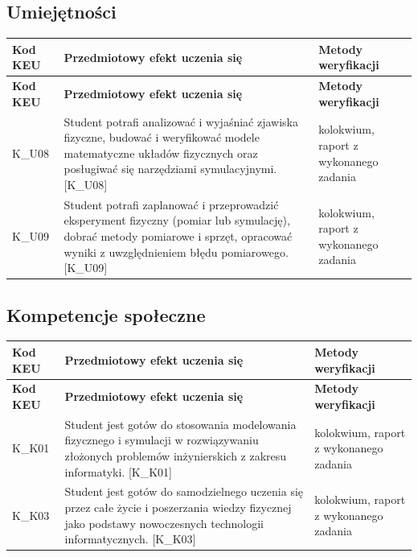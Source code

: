 \documentclass[12pt, a4paper]{article}
\newcommand{\thdrule}{\noalign{\global\setlength{\extrarowheight}{0pt}}}
\newcommand{\thdend}{\noalign{\global\setlength{\extrarowheight}{3pt}}}
\begin{document}
\subsection*{Umiejętności}
{\scriptsize
\begin{longtable}{m{1.6cm}m{9.0cm}m{4.2cm}}
\thdrule\toprule
\rowcolor{pjatkRed} {\color{white}\footnotesize\textbf{\vphantom{Ag}Kod KEU}} & {\color{white}\footnotesize\textbf{\vphantom{Ag}Przedmiotowy efekt uczenia się}} & {\color{white}\footnotesize\textbf{\vphantom{Ag}Metody weryfikacji}} \\
\midrule\thdend
\endfirsthead
\thdrule\toprule
\rowcolor{pjatkRed} {\color{white}\footnotesize\textbf{\vphantom{Ag}Kod KEU}} & {\color{white}\footnotesize\textbf{\vphantom{Ag}Przedmiotowy efekt uczenia się}} & {\color{white}\footnotesize\textbf{\vphantom{Ag}Metody weryfikacji}} \\
\midrule\thdend
\endhead
  \rowcolor{tableRowLight} K\_U08 & Student potrafi analizować i wyjaśniać zjawiska fizyczne, budować i weryfikować modele matematyczne układów fizycznych oraz posługiwać się narzędziami symulacyjnymi. {[}K\_U08{]} & kolokwium, raport z wykonanego zadania \\
  \rowcolor{tableRowAlt} K\_U09 & Student potrafi zaplanować i przeprowadzić eksperyment fizyczny (pomiar lub symulację), dobrać metody pomiarowe i sprzęt, opracować wyniki z uwzględnieniem błędu pomiarowego. {[}K\_U09{]} & kolokwium, raport z wykonanego zadania \\
\bottomrule
\end{longtable}}

\subsection*{Kompetencje społeczne}
{\scriptsize
\begin{longtable}{m{1.6cm}m{9.0cm}m{4.2cm}}
\thdrule\toprule
\rowcolor{pjatkRed} {\color{white}\footnotesize\textbf{\vphantom{Ag}Kod KEU}} & {\color{white}\footnotesize\textbf{\vphantom{Ag}Przedmiotowy efekt uczenia się}} & {\color{white}\footnotesize\textbf{\vphantom{Ag}Metody weryfikacji}} \\
\midrule\thdend
\endfirsthead
\thdrule\toprule
\rowcolor{pjatkRed} {\color{white}\footnotesize\textbf{\vphantom{Ag}Kod KEU}} & {\color{white}\footnotesize\textbf{\vphantom{Ag}Przedmiotowy efekt uczenia się}} & {\color{white}\footnotesize\textbf{\vphantom{Ag}Metody weryfikacji}} \\
\midrule\thdend
\endhead
  \rowcolor{tableRowLight} K\_K01 & Student jest gotów do stosowania modelowania fizycznego i symulacji w rozwiązywaniu złożonych problemów inżynierskich z zakresu informatyki. {[}K\_K01{]} & kolokwium, raport z wykonanego zadania \\
  \rowcolor{tableRowAlt} K\_K03 & Student jest gotów do samodzielnego uczenia się przez całe życie i poszerzania wiedzy fizycznej jako podstawy nowoczesnych technologii informatycznych. {[}K\_K03{]} & kolokwium, raport z wykonanego zadania \\
\bottomrule
\end{longtable}}
\end{document}
